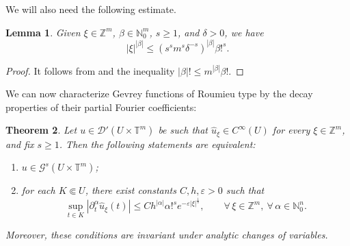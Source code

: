 \documentclass[11pt,reqno]{amsart}
\numberwithin{equation}{section}
\newtheorem{theorem}{Theorem}[section]
\newtheorem{lemma}[theorem]{Lemma}
\begin{document}
We will also need the following estimate.

\begin{lemma}\label{xi_beta_exp}
	Given \(\xi\in\mathbb{Z}^m\), \(\beta\in\mathbb{N}_0^m\), \(s\geq 1\), and \(\delta>0\), we have
	\[
	|\xi|^{|\beta|}
	\leq
	\left(s^s m^s \delta^{-s}\right)^{|\beta|}\beta!^s.
	\]
\end{lemma}
\begin{proof}
	It follows from \cite[Lemma A.5]{KowTok_arXiv} and the inequality \( |\beta|!\leq m^{|\beta|}\beta! \).
\end{proof}

We can now characterize Gevrey functions of Roumieu type by the decay properties of their partial Fourier coefficients:

\begin{theorem}
	Let \(u\in\mathscr{D}'(U\times\mathbb{T}^m)\) be such that \(\widehat{u}_\xi\in C^\infty(U)\) for every \(\xi\in\mathbb{Z}^m\), and fix \(s\geq 1\).
	Then the following statements are equivalent:
	\begin{enumerate}
		\item \(u\in \mathscr{G}^s(U\times\mathbb{T}^m)\);
		\item for each \(K\Subset U\), there exist constants \(C,h,\varepsilon>0\) such that
		\[
		\sup_{t\in K}|\partial_t^\alpha\widehat{u}_\xi(t)|
		\leq
		Ch^{|\alpha|}\alpha!^s e^{-\varepsilon|\xi|^{\frac{1}{s}}},
		\qquad
		\forall\,\xi\in\mathbb{Z}^m,\ \forall\, \alpha\in\mathbb{N}_0^n.
		\]
	\end{enumerate}
	
	Moreover, these conditions are invariant under analytic changes of variables.
\end{theorem}
\end{document}
